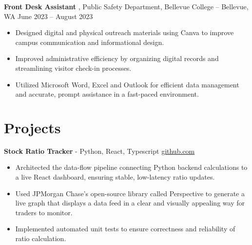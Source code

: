 \documentclass[11pt]{article}       %
\begin{document}
\textbf{Front Desk Assistant} {, Public Safety Department, Bellevue College} -- Bellevue, WA \hfill June 2023 -- August 2023 \\
\vspace{-9pt}
\begin{itemize}
  \item Designed digital and physical outreach materials using Canva to improve campus communication and informational design.
  \item Improved administrative efficiency by organizing digital records and streamlining visitor check-in processes.
  \item Utilized Microsoft Word, Excel and Outlook for efficient data management and accurate, prompt assistance in a fast-paced environment.
\end{itemize}

\vspace{-18.5pt}

\section*{Projects}

\textbf{Stock Ratio Tracker}{ - Python, React, Typescript} \hfill \href{https://github.com/Monica20030707/tradingDashboard-UI}{github.com} \\
\vspace{-9pt}
\begin{itemize}
  \item Architected the data-flow pipeline connecting Python backend calculations to a live React dashboard, ensuring stable, low-latency ratio updates. 
  \item Used JPMorgan Chase’s open-source library called Perspective to generate a live graph that displays a data feed in a clear and visually appealing way for traders to monitor.
  \item Implemented automated unit tests to ensure correctness and reliability of ratio calculation.
\end{itemize}

\end{document}

